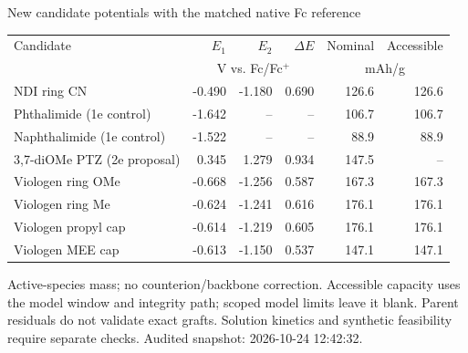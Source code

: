 \begin{frame}{New candidate potentials with the matched native Fc reference}
\scriptsize\renewcommand{\arraystretch}{1.25}\centering
\begin{tabular}{@{}p{4.7cm}rrrrr@{}}\toprule
Candidate & $E_1$ & $E_2$ & $\Delta E$ & Nominal & Accessible \\
& \multicolumn{3}{c}{V vs. Fc/Fc$^+$} & \multicolumn{2}{c}{mAh/g} \\ \midrule
NDI ring CN & -0.490 & -1.180 & 0.690 & 126.6 & 126.6 \\
Phthalimide (1e control) & -1.642 & -- & -- & 106.7 & 106.7 \\
Naphthalimide (1e control) & -1.522 & -- & -- & 88.9 & 88.9 \\
3,7-diOMe PTZ (2e proposal) & 0.345 & 1.279 & 0.934 & 147.5 & -- \\
Viologen ring OMe & -0.668 & -1.256 & 0.587 & 167.3 & 167.3 \\
Viologen ring Me & -0.624 & -1.241 & 0.616 & 176.1 & 176.1 \\
Viologen propyl cap & -0.614 & -1.219 & 0.605 & 176.1 & 176.1 \\
Viologen MEE cap & -0.613 & -1.150 & 0.537 & 147.1 & 147.1 \\
\bottomrule\end{tabular}\par
\vspace{1ex}\raggedright
\footnotesize Active-species mass; no counterion/backbone correction. Accessible capacity uses the model window and integrity path; scoped model limits leave it blank.
\vspace{1ex}\scriptsize Parent residuals do not validate exact grafts. Solution kinetics and synthetic feasibility require separate checks.
\vfill\scriptsize Audited snapshot: 2026-10-24 12:42:32.
\end{frame}
